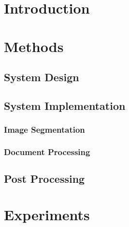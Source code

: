 \documentclass[10pt, conference, compsocconf]{IEEEtran}
\begin{document}
	\IEEEpeerreviewmaketitle
	
	\section{Introduction}
	

	
	\section{Methods}
		\subsection{System Design}



		\subsection{System Implementation}



			\subsubsection{Image Segmentation}



			\subsubsection{Document Processing}



		\subsection{Post Processing}



	\section{Experiments}



	
		
	
\end{document}
